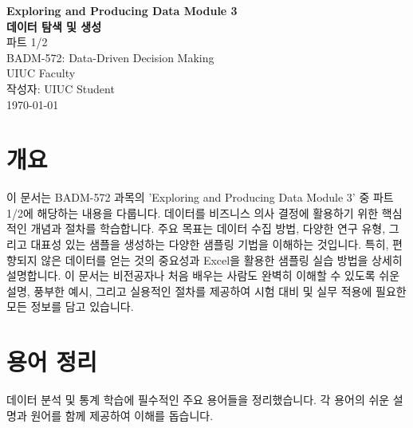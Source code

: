 \documentclass[11pt,a4paper]{article}
\begin{document}
\begin{titlepage}
    \centering
    \vspace*{1cm}
    {\Huge\bfseries Exploring and Producing Data Module 3}\\[1cm]
    {\Large\bfseries 데이터 탐색 및 생성}\\[0.5cm]
    {\Large 파트 1/2}\\[2cm]
    {\Large BADM-572: Data-Driven Decision Making}\\[0.5cm]
    {\large UIUC Faculty}\\[3cm]
    {\large 작성자: UIUC Student}\\[0.5cm]
    {\large \today}\\[2cm]
    \vfill
\end{titlepage}

\clearpage
\tableofcontents
\clearpage

\section*{개요}

이 문서는 BADM-572 과목의 'Exploring and Producing Data Module 3' 중 파트 1/2에 해당하는 내용을 다룹니다.
데이터를 비즈니스 의사 결정에 활용하기 위한 핵심적인 개념과 절차를 학습합니다.
주요 목표는 데이터 수집 방법, 다양한 연구 유형, 그리고 대표성 있는 샘플을 생성하는 다양한 샘플링 기법을 이해하는 것입니다.
특히, 편향되지 않은 데이터를 얻는 것의 중요성과 Excel을 활용한 샘플링 실습 방법을 상세히 설명합니다.
이 문서는 비전공자나 처음 배우는 사람도 완벽히 이해할 수 있도록 쉬운 설명, 풍부한 예시, 그리고 실용적인 절차를 제공하여 시험 대비 및 실무 적용에 필요한 모든 정보를 담고 있습니다.

\newpage
\section*{용어 정리}

데이터 분석 및 통계 학습에 필수적인 주요 용어들을 정리했습니다. 각 용어의 쉬운 설명과 원어를 함께 제공하여 이해를 돕습니다.
\end{document}
